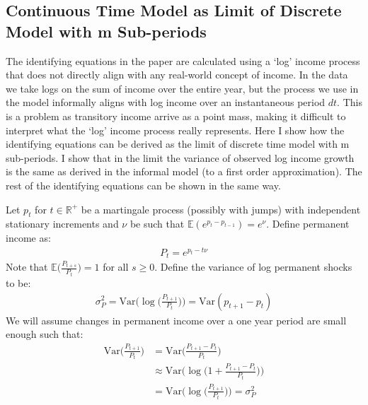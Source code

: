 \subsection{Continuous Time Model as Limit of Discrete Model with m Sub-periods} \label{log_tranformation}
The identifying equations in the paper are calculated using a `log' income process that does not directly align with any real-world concept of income. In the data we take logs on the sum of income over the entire year, but the process we use in the model informally aligns with log income over an instantaneous period $dt$. This is a problem as transitory income arrive as a point mass, making it difficult to interpret what the `log' income process really represents. Here I show how the identifying equations can be derived as the limit of discrete time model with m sub-periods. I show that in the limit the variance of observed log income growth is the same as derived in the informal model (to a first order approximation). The rest of the identifying equations can be shown in the same way.

Let $p_t$ for $t\in\mathbb{R}^+$ be a martingale process (possibly with jumps) with independent stationary increments and $\nu$ be such that $\mathbb{E}(e^{p_t - p_{t-1}})=e^{\nu}$. Define permanent income as:
\begin{align*}
P_t = e^{p_t - t \nu}
\end{align*}
Note that $\mathbb{E}\Big(\frac{P_{t+s}}{P_t}\Big)=1$ for all $s\geq 0$. Define the variance of log permanent shocks to be:
\begin{align*} \sigma^2_P=\mathrm{Var}\Big(\log\big(\frac{P_{t+1}}{P_t}\big)\Big) = \mathrm{Var}(p_{t+1}-p_t)
\end{align*}
We will assume changes in permanent income over a one year period are small enough such that:
\begin{align} \mathrm{Var}\Big(\frac{P_{t+1}}{P_t}\Big) &= \mathrm{Var}\Big(\frac{P_{t+1}-P_t}{P_t}\Big) \nonumber \\
& \approx \mathrm{Var}\Big(\log\big(1+\frac{P_{t+1}-P_t}{P_t}\big)\Big) \nonumber \\
&= \mathrm{Var}\Big(\log\big(\frac{P_{t+1}}{P_t}\big)\Big) = \sigma^2_P \nonumber
\end{align}

